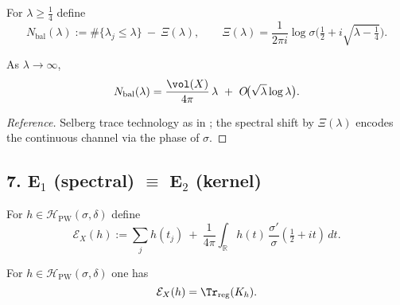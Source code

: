\begin{definition}\relax\hspace{0pt}
\label{def:tfc1-balance} %
For $\lambda\ge\tfrac14$ define
\[
N_{\mathrm{bal}}(\lambda):= \#\{\lambda_j\le\lambda\}\ -\ \Xi(\lambda),\qquad \Xi(\lambda)=\frac{1}{2\pi i}\log\sigma\!\Big(\tfrac12+i\sqrt{\lambda-\tfrac14}\Big).
\]
\end{definition}

\begin{theorem}\relax\hspace{0pt}
\label{thm:tfc1-bweyl} %
As $\lambda\to\infty$,
\[
N_{\mathrm{bal}}(\lambda)=\frac{\vol(X)}{4\pi}\,\lambda\ +\ O\!\big(\sqrt{\lambda}\log\lambda\big).
\]
\end{theorem}

\begin{proof}[Reference]\relax\hspace{0pt}
Selberg trace technology as in \cite{HejhalII,SelbergCollected}; the spectral shift by $\Xi(\lambda)$ encodes the continuous channel via the phase of $\sigma$.\relax\hspace{0pt}
\end{proof}

\subsection*{7. E\texorpdfstring{$_1$}{1} (spectral) $\equiv$ E\texorpdfstring{$_2$}{2} (kernel)}\relax\hspace{0pt}
\label{subsec:tfc1-E1E2} %

\begin{definition}\relax\hspace{0pt}
\label{def:tfc1-E1} %
For $h\in\mathcal{H}_{\mathrm{PW}}(\sigma,\delta)$ define
\[
\mathcal{E}_X(h):=\sum_{j}h(t_j)\ +\ \frac{1}{4\pi}\int_{\mathbb{R}}h(t)\,\frac{\sigma'}{\sigma}\!\left(\tfrac12+it\right)\,dt.
\]
\end{definition}

\begin{theorem}\relax\hspace{0pt}
\label{thm:tfc1-E1E2} %
For $h\in\mathcal{H}_{\mathrm{PW}}(\sigma,\delta)$ one has
\[
\mathcal{E}_X(h)=\Tr_{\mathrm{reg}}(K_h).
\]
\end{theorem}

